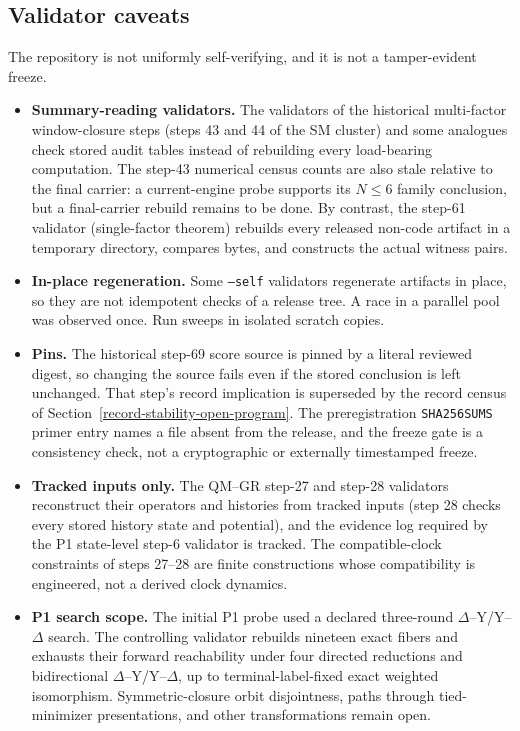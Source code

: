\subsection{Validator caveats}

The repository is not uniformly self-verifying, and it is not a tamper-evident freeze.

\begin{itemize}\tightlist
\item \textbf{Summary-reading validators.} The validators of the historical multi-factor window-closure steps
  (steps 43 and 44 of the SM cluster) and some analogues check stored audit tables instead of rebuilding every
  load-bearing computation. The step-43 numerical census counts are also stale relative to the final carrier: a
  current-engine probe supports its \(N\le6\) family conclusion, but a final-carrier rebuild remains to be done. By
  contrast, the step-61 validator (single-factor theorem) rebuilds every released non-code artifact in a temporary directory,
  compares bytes, and constructs the actual witness pairs.
\item \textbf{In-place regeneration.} Some \texttt{--self} validators regenerate artifacts in place, so they are not
  idempotent checks of a release tree. A race in a parallel pool was observed once. Run sweeps in isolated scratch
  copies.
\item \textbf{Pins.} The historical step-69 score source is pinned by a literal reviewed digest, so changing the
  source fails even if the stored conclusion is left unchanged. That step's record implication is superseded by the
  record census of Section~\ref{record-stability-open-program}. The preregistration \texttt{SHA256SUMS} primer entry
  names a file absent from the release, and the freeze gate is a consistency check, not a cryptographic or externally
  timestamped freeze.
\item \textbf{Tracked inputs only.} The QM--GR step-27 and step-28 validators reconstruct their operators and histories
  from tracked inputs (step 28 checks every stored history state and potential), and the evidence log required by the
  P1 state-level step-6 validator is tracked. The compatible-clock constraints of steps 27--28 are finite
  constructions whose compatibility is engineered, not a derived clock dynamics.
\item \textbf{P1 search scope.} The initial P1 probe used a declared three-round \(\Delta\)--Y/Y--\(\Delta\) search. The
  controlling validator rebuilds nineteen exact fibers and exhausts their forward reachability under four directed
  reductions and bidirectional \(\Delta\)--Y/Y--\(\Delta\), up to terminal-label-fixed exact weighted isomorphism.
  Symmetric-closure orbit disjointness, paths through tied-minimizer presentations, and other transformations remain
  open.
\end{itemize}

